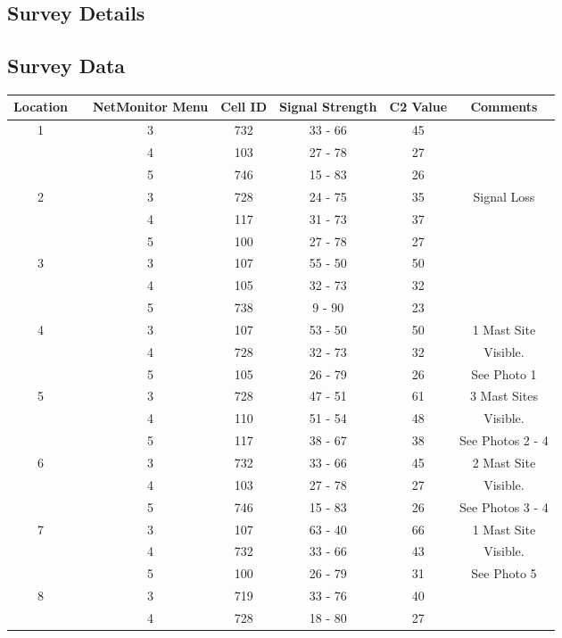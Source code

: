 \documentclass[a4paper,12pt]{article}
\begin{document}
\subsection{Survey Details}

\subsection{Survey Data}

\begin{tabular}{|c|c|c|c|c|c|c|}
\hline
Location	&	&	NetMonitor Menu	&	Cell ID	&	Signal Strength	& C2 Value	& Comments	\\
\hline
1	&		&	 3	&	732	&	33 - 66	&	45	&		\\
 	&		&	 4	&	103	&	27 - 78	&	27	&		\\
 	&		&	 5	&	746	&	15 - 83	&	26	&		\\
\hline	
2	&		&	 3	&	728	&	24 - 75	&	35	&	Signal Loss	\\
 	&		&	 4	&	117	&	31 - 73	&	37	&		\\
 	&		&	 5	&	100	&	27 - 78	&	27	&		\\
\hline	
3	&		&	 3	&	107	&	55 - 50	&	50	&		\\
 	&		&	 4	&	105	&	32 - 73	&	32	&		\\
 	&		&	 5	&	738	&	 9 - 90	&	23	&		\\
\hline	
4	&		&	 3	&	107	&	53 - 50	&	50	&	1 Mast Site \\
 	&		&	 4	&	728	&	32 - 73	&	32	&	Visible.		\\
 	&		&	 5	&	105	&	26 - 79	&	26	&	See Photo 1	\\
\hline	
5	&		&	 3	&	728	&	47 - 51	&	61	&	3 Mast Sites	\\
 	&		&	 4	&	110	&	51 - 54	&	48	&	Visible.	  		\\
 	&		&	 5	&	117	&	38 - 67	&	38	&	See Photos 2 - 4\\
\hline	
6	&		&	 3	&	732	&	33 - 66	&	45	&	2 Mast Site	\\
 	&		&	 4	&	103	&	27 - 78	&	27	&	Visible.	  	\\
 	&		&	 5	&	746	&	15 - 83	&	26	&	See Photos 3 - 4 \\
\hline	
7	&		&	 3	&	107	&	63 - 40	&	66	&	1 Mast Site	\\
 	&		&	 4	&	732	&	33 - 66	&	43	&	Visible.	  	\\
 	&		&	 5	&	100	&	26 - 79	&	31	&	See Photo 5	\\
\hline	
8	&		&	 3	&	719	&	33 - 76	&	40	&		\\
 	&		&	 4	&	728	&	18 - 80	&	27	&		\\

\end{tabular}
\end{document}
